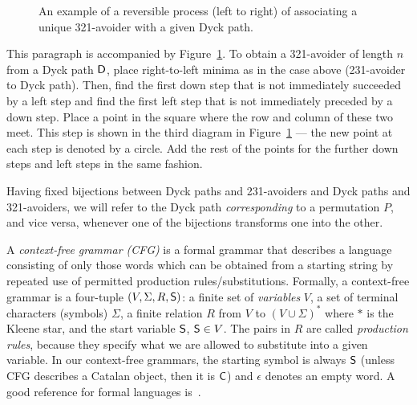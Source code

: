 \documentclass[12pt, a4paper, twoside]{report}
\begin{document}
\begin{figure}[!ht]
\begin{center}
\caption{\small{An example of a reversible process (left to right) of associating a unique 321-avoider with a given Dyck path.}}
\label{fig:bij321dyck}
\end{center}
\end{figure}

This paragraph is accompanied by Figure~\ref{fig:bij321dyck}. To obtain a 321-avoider of length $n$ from a Dyck path $\textsf{D}$, place right-to-left minima as in the case above (231-avoider to Dyck path). Then, find the first down step that is not immediately succeeded by a left step and find the first left step that is not immediately preceded by a down step. Place a point in the square where the row and column of these two meet. This step is shown in the third diagram in Figure~\ref{fig:bij321dyck} --- the new point at each step is denoted by a circle. Add the rest of the points for the further down steps and left steps in the same fashion.

Having fixed bijections between Dyck paths and 231-avoiders and Dyck paths and 321-avoiders, we will refer to the Dyck path \emph{corresponding} to a permutation $P$, and vice versa, whenever one of the bijections transforms one into the other.

A \emph{context-free grammar (CFG)} is a formal grammar that describes a language consisting of only those words which can be obtained from a starting string by repeated use of permitted production rules/substitutions. Formally, a context-free grammar is a four-tuple $(V, \Sigma, R, \mathsf{S} )$: a finite set of \emph{variables} $V$, a set of terminal characters (symbols) $\Sigma$, a finite relation $R$ from $V$ to $(V \cup \Sigma)^*$ where $*$ is the Kleene star, and the start variable $\mathsf{S}$, $\mathsf{S} \in V$. The pairs in $R$ are called \emph{production rules}, because they specify what we are allowed to substitute into a given variable. In our context-free grammars, the starting symbol is always $\mathsf{S}$ (unless CFG describes a Catalan object, then it is $\mathsf{C}$) and $\epsilon$ denotes an empty word. A good reference for formal languages is~\cite{hopcroft2001automata}.
\end{document}
